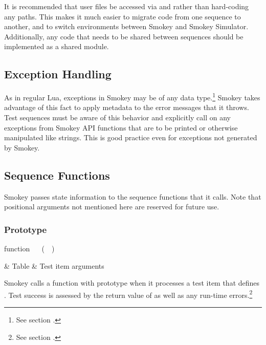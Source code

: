 It is recommended that user files be accessed via  and
 rather than hard-coding any paths.  This makes it much
easier to migrate code from one sequence to another, and to switch environments
between Smokey and Smokey Simulator.  Additionally, any code that needs to be
shared between sequences should be implemented as a shared module.

\subsection{Exception Handling}

As in regular Lua, exceptions in Smokey may be of any data type.\footnote{See
section .} Smokey takes advantage of this fact to
apply metadata to the error messages that it throws.  Test sequences must be
aware of this behavior and explicitly call  on any exceptions
from Smokey API functions that are to be printed or otherwise manipulated like
strings.  This is good practice even for exceptions not generated by Smokey.

\subsection{Sequence Functions}
\label{sec:SequenceFunctions}

Smokey passes state information to the sequence functions that it calls.  Note
that positional arguments not mentioned here are reserved for future use.

\subsubsection{ Prototype}

\begin{minipage}{\linewidth}
\begin{SmokeyApi}
function ~~ (~~)
\end{SmokeyApi}

\begin{HandlerApiTable}
	 & Table & Test item arguments \\
\end{HandlerApiTable}
\end{minipage}

Smokey calls a function with prototype  when it processes
a test item that defines .  Test success is assessed by
the return value of  as well as any run-time
errors.\footnote{See section .}

